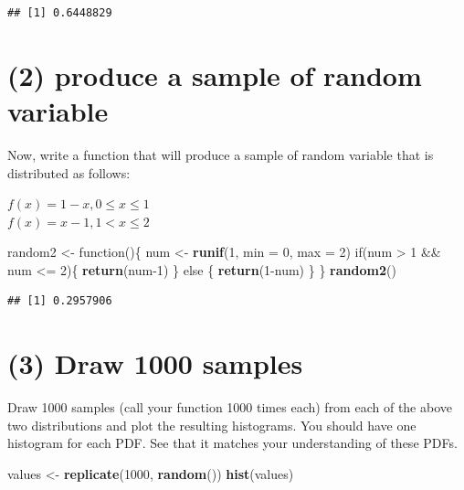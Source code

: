 \documentclass[]{article}
\newenvironment{Shaded}{\begin{snugshade}}{\end{snugshade}}
\newcommand{\KeywordTok}[1]{\textcolor[rgb]{0.13,0.29,0.53}{\textbf{{#1}}}}
\newcommand{\DataTypeTok}[1]{\textcolor[rgb]{0.13,0.29,0.53}{{#1}}}
\newcommand{\DecValTok}[1]{\textcolor[rgb]{0.00,0.00,0.81}{{#1}}}
\newcommand{\StringTok}[1]{\textcolor[rgb]{0.31,0.60,0.02}{{#1}}}
\newcommand{\NormalTok}[1]{{#1}}
\begin{document}
\begin{verbatim}
## [1] 0.6448829
\end{verbatim}

\section{(2) produce a sample of random
variable}\label{produce-a-sample-of-random-variable-1}

Now, write a function that will produce a sample of random variable that
is distributed as follows:

\(f(x) = 1 - x, 0 \leq x \leq 1\)\\
\(f(x) = x - 1, 1 < x \leq 2\)

\begin{Shaded}
\begin{Highlighting}[]
\NormalTok{random2 <-}\StringTok{ }\NormalTok{function()\{}
          \NormalTok{num <-}\StringTok{ }\KeywordTok{runif}\NormalTok{(}\DecValTok{1}\NormalTok{, }\DataTypeTok{min =} \DecValTok{0}\NormalTok{, }\DataTypeTok{max =} \DecValTok{2}\NormalTok{) }
          \NormalTok{if(num >}\StringTok{ }\DecValTok{1} \NormalTok{&&}\StringTok{ }\NormalTok{num <=}\StringTok{ }\DecValTok{2}\NormalTok{)\{}
             \KeywordTok{return}\NormalTok{(num}\DecValTok{-1}\NormalTok{)}
            \NormalTok{\} else \{}
              \KeywordTok{return}\NormalTok{(}\DecValTok{1}\NormalTok{-num)}
            \NormalTok{\}}
          \NormalTok{\} }
\KeywordTok{random2}\NormalTok{()}
\end{Highlighting}
\end{Shaded}

\begin{verbatim}
## [1] 0.2957906
\end{verbatim}

\section{(3) Draw 1000 samples}\label{draw-1000-samples}

Draw 1000 samples (call your function 1000 times each) from each of the
above two distributions and plot the resulting histograms. You should
have one histogram for each PDF. See that it matches your understanding
of these PDFs.

\begin{Shaded}
\begin{Highlighting}[]
\NormalTok{values <-}\StringTok{ }\KeywordTok{replicate}\NormalTok{(}\DecValTok{1000}\NormalTok{, }\KeywordTok{random}\NormalTok{())}
\KeywordTok{hist}\NormalTok{(values)}
\end{Highlighting}
\end{Shaded}
\end{document}
